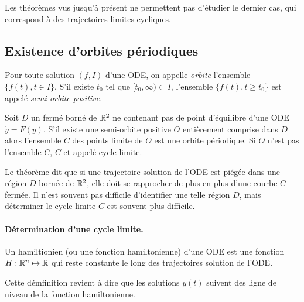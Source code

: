 Les théorèmes vus jusqu'à présent ne permettent pas d'étudier le dernier cas, qui correspond à des trajectoires limites cycliques.

\subsection{Existence d'orbites périodiques} 

\begin{definition}[Orbite]
  Pour toute solution $(f, I)$ d'une ODE, on appelle \emph{orbite} l'ensemble $\{f(t), t \in I\}$. S'il existe $t_0$ tel que $[t_0, \infty) \subset I$, l'ensemble $\{f(t), t \geq t_0\}$ est appelé \emph{semi-orbite positive}.
\end{definition}

\begin{theorem}
  Soit $D$ un fermé borné de $\mathbb{R}^2$ ne contenant pas de point d'équilibre d'une ODE $\dot y = F(y)$. S'il existe une semi-orbite positive $O$ entièrement comprise dans $D$ alors l'ensemble $C$ des points limite de $O$ est une orbite périodique. Si $O$ n'est pas l'ensemble $C$, $C$ et appelé cycle limite.
\end{theorem}

\remark
Le théorème dit que si une trajectoire solution de l'ODE est piégée dans une région $D$ bornée de $\mathbb{R}^2$, elle doit se rapprocher de plus en plus d'une courbe $C$ fermée. Il n'est souvent pas difficile d'identifier une telle région $D$, mais déterminer le cycle limite $C$ est souvent plus difficile.

\paragraph*{Détermination d'une cycle limite.} 

\begin{definition}[Hamiltionien]
  Un hamiltionien (ou une fonction hamiltonienne) d'une ODE est une fonction $H : \mathbb{R}^n \mapsto \mathbb{R}$ qui reste constante le long des trajectoires solution de l'ODE.
\end{definition}

\remark
Cette démfinition revient à dire que les solutions $y(t)$ suivent des ligne de niveau de la fonction hamiltonienne.

